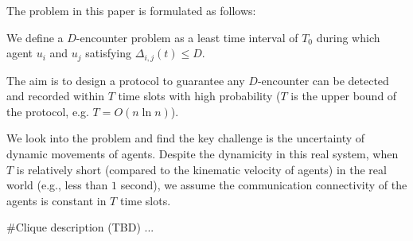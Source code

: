 The problem in this paper is formulated as follows:
\begin{problem}
    We define a $D$-encounter problem as a least
    time interval of $T_0$ during which agent $u_i$ and $u_j$ satisfying
    $\Delta_{i,j}(t) \leq D$.
\end{problem}

The aim is to design a protocol to guarantee any $D$-encounter 
can be detected and recorded within $T$ time slots with high probability 
($T$ is the upper bound of the protocol, e.g. $T=O(n\ln n)$).

We look into the problem and find the key challenge is the uncertainty of dynamic movements
of agents. Despite the dynamicity in this real system, 
when $T$ is relatively short (compared to the kinematic velocity of agents) in the 
real world (e.g., less than $1$ second),
we assume the communication connectivity of the agents is constant in $T$
time slots. 

\#Clique description (TBD) ...
